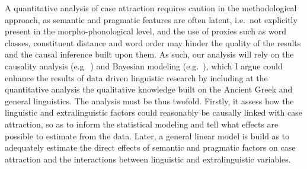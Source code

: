 \documentclass[article,a4paper,12pt]{memoir}
\begin{document}
A quantitative analysis of case attraction requires caution in the
methodological approach, as semantic and pragmatic features are often latent,
i.e.\ not explicitly present in the morpho-phonological level, and the use of
proxies such as word classes, constituent distance and word order may hinder the
quality of the results and the causal inference built upon them.
As such, our analysis will rely on the causality analysis (e.g.~\cite{Pearl2009})
and Bayesian modeling (e.g.~\cite{McElreath2020}), which I argue could 
enhance the results of data driven linguistic research by including at the 
quantitative analysis the qualitative knowledge built on the Ancient Greek 
and general linguistics.
The analysis must be thus twofold. Firstly, it assess how the linguistic and
extralinguistic factors could reasonably be causally linked with case
attraction, so as to inform the statistical modeling and tell what effects are
possible to estimate from the data.
Later, a general linear model is build as to adequately estimate the direct
effects of semantic and pragmatic factors on case attraction and the
interactions between linguistic and extralinguistic variables.

\printbibliography%
\end{document}
